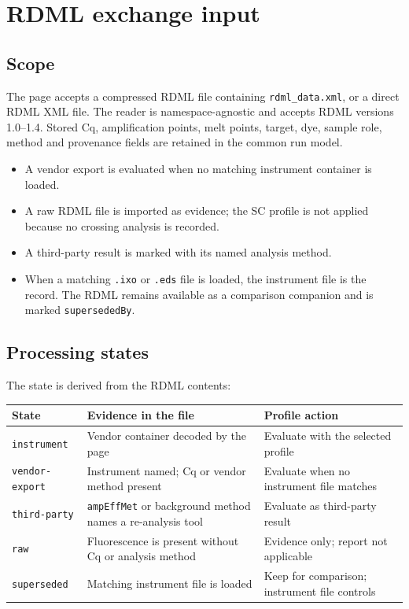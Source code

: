\chapter{RDML exchange input}\label{ch:rdml}


\section{Scope}
The page accepts a compressed RDML file containing \texttt{rdml\_data.xml}, or a direct RDML XML file. The reader is namespace-agnostic and accepts RDML versions 1.0--1.4. Stored Cq, amplification points, melt points, target, dye, sample role, method and provenance fields are retained in the common run model.

\begin{itemize}
\item A vendor export is evaluated when no matching instrument container is loaded.
\item A raw RDML file is imported as evidence; the SC profile is not applied because no crossing analysis is recorded.
\item A third-party result is marked with its named analysis method.
\item When a matching \texttt{.ixo} or \texttt{.eds} file is loaded, the instrument file is the record. The RDML remains available as a comparison companion and is marked \texttt{supersededBy}.
\end{itemize}

\section{Processing states}
The state is derived from the RDML contents:

\begin{center}\small
\begin{tabular}{@{}p{3.0cm}p{7.2cm}p{4.0cm}@{}}\toprule
State & Evidence in the file & Profile action\\\midrule
\texttt{instrument} & Vendor container decoded by the page & Evaluate with the selected profile\\
\texttt{vendor-export} & Instrument named; Cq or vendor method present & Evaluate when no instrument file matches\\
\texttt{third-party} & \texttt{ampEffMet} or background method names a re-analysis tool & Evaluate as third-party result\\
\texttt{raw} & Fluorescence is present without Cq or analysis method & Evidence only; report not applicable\\
\texttt{superseded} & Matching instrument file is loaded & Keep for comparison; instrument file controls\\\bottomrule
\end{tabular}
\end{center}


